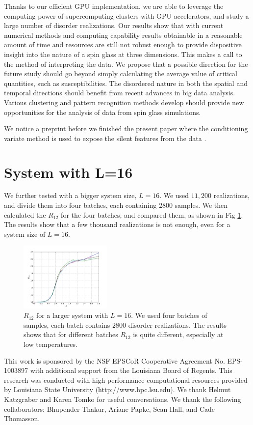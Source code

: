 \documentclass[aps,prb,twocolumn,showpacs,superscriptaddress]{revtex4}
\begin{document}
Thanks to our efficient GPU implementation, we are able to leverage the computing
power of supercomputing clusters with GPU accelerators, and study a large number of disorder
realizations. Our results show that with current numerical methods and computing capability  
results obtainable in a reasonable amount of time and resources are still not robust enough 
to provide dispositive insight into the nature of a spin glass at three dimensions. This makes a call 
to the method of interpreting the data. We propose that a possible direction for the 
future study should go beyond simply calculating the average value of critical quantities, 
such as susceptibilities. The disordered nature in both the spatial and temporal directions 
should benefit from recent advances in big data analysis. Various clustering and
pattern recognition methods develop should provide new opportunities for the
analysis of data from spin glass simulations. 

We notice a preprint before we finished the present paper where the conditioning variate method
is used to expose the silent features from the data \cite{Baity-Jesi-etal-2014}. 


\appendix
\section{System with L=16}

We further tested with a bigger system size, $L=16$. We used $11,200$ realizations,
and divide them into four batches, each containing $2800$ samples. We then calculated
the $R_{12}$ for the four batches, and compared them, as shown in Fig \ref{fig:l16_r12}. 
The results show that a few thousand realizations is not enough, even for a 
system size of $L=16$. 


\begin{figure}[ht]
  \centering
  \includegraphics[width=0.4\textwidth]{img/l16_r12.pdf}
  \caption{$R_{12}$ for a larger system with $L=16$. We used four batches of samples,
each batch contains $2800$ disorder realizations. The results shows that for
different batches $R_{12}$ is quite different, especially at low temperatures.
}
\label{fig:l16_r12}
\end{figure}


This work is sponsored by the NSF EPSCoR Cooperative Agreement No. EPS-1003897 with additional support 
from the Louisiana Board of Regents. This research was conducted with high performance computational resources provided by 
Louisiana State University (http://www.hpc.lsu.edu). We thank Helmut Katzgraber and Karen 
Tomko for useful conversations. We thank the following collaborators: Bhupender Thakur, Ariane Papke, Sean Hall, and Cade Thomasson. 


\end{document}
